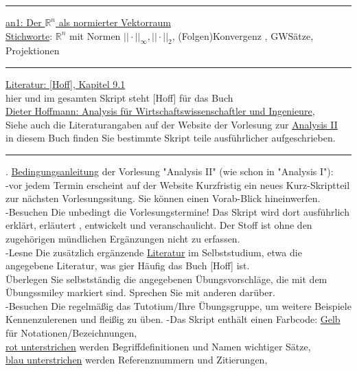 \documentclass[11pt]{article}
\newcommand{\redcircle}[1]{%
	\tikz[baseline=(char.base)]{
		\node[shape=circle, draw=red, text=red, thick, inner sep=1pt] (char) {\textbf{#1}};
	}%
}
\begin{document}
	
	\Large
	
	
	
	
	
	\medskip\hrule\medskip
	\underline{an1: Der $\mathbb{R}^n$ als normierter Vektorraum}\\
	\underline{Stichworte}: $\mathbb{R}^n$ mit Normen $||\cdot||_{\infty}, ||\cdot||_2$, (Folgen)Konvergenz , GWSätze, Projektionen\\
	\medskip\hrule\medskip
	\underline{Literatur: [Hoff], Kapitel 9.1}\\
	hier  und im gesamten Skript steht [Hoff] für das Buch\\
	\underline{Dieter Hoffmann: Analysis für Wirtschaftswissenschaftler und Ingenieure},\\
	Siehe auch die Literaturangaben auf der Website der Vorlesung zur \href{https://www.math.uni-duesseldorf.de/~internet/Ana2_SoSe25/#veranstaltungen}{Analysis II}\\
	in diesem Buch finden Sie bestimmte Skript teile ausführlicher aufgeschrieben.\\
	\medskip\hrule{}. \underline{Bedingungsanleitung} der Vorlesung "Analysis II" (wie schon in "Analysis I"):\\
	-vor jedem Termin erscheint auf der Website Kurzfristig ein neues Kurz-Skriptteil zur nächsten Vorlesungssitung. Sie können einen Vorab-Blick hineinwerfen.\\
	-Besuchen Die unbedingt die Vorlesungstermine! Das Skript wird dort ausführlich erklärt, erläutert , entwickelt und veranschaulicht. Der Stoff ist ohne den zugehörigen mündlichen Ergänzungen nicht zu erfassen.\\
	-Lesne Die zusätzlich ergänzende \underline{Literatur} im Selbststudium, etwa die angegebene Literatur, was gier Häufig das Buch [Hoff] ist.\\
	Überlegen Sie selbstständig die angegebenen Übungsvorschläge, die mit dem Übungssmiley \redcircle{Ü} markiert sind. Sprechen Sie mit anderen darüber.\\
	-Besuchen Die regelmäßig das Tutotium/Ihre Übungsgruppe, um weitere Beispiele Kennenzulerenen und fleißig zu üben.
	-Das Skript enthält einen Farbcode: \ul{Gelb} für Notationen/Bezeichnungen,\\
	\ul{rot unterstrichen} werden Begriffdefinitionen und Namen wichtiger Sätze,\\
	\ul{blau unterstrichen} werden Referenznummern und Zitierungen,\\
\end{document}
